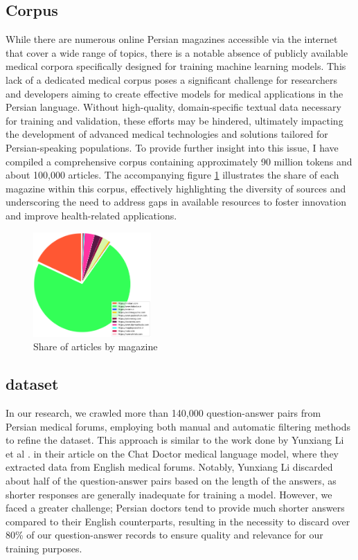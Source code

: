\documentclass[conference]{IEEEtran}
\begin{document}
\subsection{Corpus}
While there are numerous online Persian magazines accessible via the internet that cover a wide range of topics, there is a notable absence of publicly available medical corpora specifically designed for training machine learning models. This lack of a dedicated medical corpus poses a significant challenge for researchers and developers aiming to create effective models for medical applications in the Persian language. Without high-quality, domain-specific textual data necessary for training and validation, these efforts may be hindered, ultimately impacting the development of advanced medical technologies and solutions tailored for Persian-speaking populations. To provide further insight into this issue, I have compiled a comprehensive corpus containing approximately 90 million tokens and about 100,000 articles. The accompanying figure
\ref{fig1}
illustrates the share of each magazine within this corpus, effectively highlighting the diversity of sources and underscoring the need to address gaps in available resources to foster innovation and improve health-related applications.


\begin{figure}[htbp]
	\centerline{\includegraphics[width=0.4\textwidth]{fig1.png}}
	\caption{Share of articles by magazine}
	\label{fig1}
\end{figure}

\subsection{dataset}
In our research, we crawled more than 140,000 question-answer pairs from Persian medical forums, employing both manual and automatic filtering methods to refine the dataset. This approach is similar to the work done by Yunxiang Li et al
\cite{b6}
. in their article on the Chat Doctor medical language model, where they extracted data from English medical forums. Notably, Yunxiang Li discarded about half of the question-answer pairs based on the length of the answers, as shorter responses are generally inadequate for training a model. However, we faced a greater challenge; Persian doctors tend to provide much shorter answers compared to their English counterparts, resulting in the necessity to discard over 80\% of our question-answer records to ensure quality and relevance for our training purposes.
\end{document}
